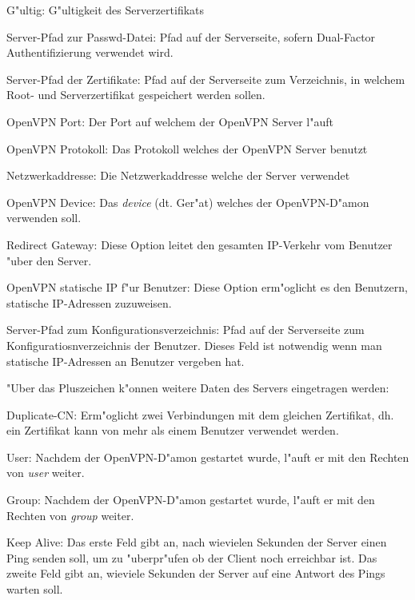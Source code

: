 \begin{items}
	\item G"ultig: G"ultigkeit des Serverzertifikats
	\item Server-Pfad zur Passwd-Datei: Pfad auf der Serverseite, sofern
	      Dual-Factor Authentifizierung verwendet wird.
	\item Server-Pfad der Zertifikate: Pfad auf der Serverseite zum
	Verzeichnis, in welchem Root- und Serverzertifikat gespeichert werden
	sollen.
	\item OpenVPN Port: Der Port auf welchem der OpenVPN Server l"auft
	\item OpenVPN Protokoll: Das Protokoll welches der OpenVPN Server benutzt
	\item Netzwerkaddresse: Die Netzwerkaddresse welche der Server verwendet
	\item OpenVPN Device: Das \textit{device} (dt. Ger"at) welches der
	OpenVPN-D"amon verwenden soll.
	\item Redirect Gateway: Diese Option leitet den gesamten IP-Verkehr vom
	Benutzer "uber den Server.
	\item OpenVPN statische IP f"ur Benutzer: Diese Option erm"oglicht es den
	Benutzern, statische IP-Adressen zuzuweisen.
	\item Server-Pfad zum Konfigurationsverzeichnis: Pfad auf der Serverseite
	zum Konfiguratiosnverzeichnis der Benutzer. Dieses Feld ist notwendig
	wenn man statische IP-Adressen an Benutzer vergeben hat.


\end{items}

\nl "Uber das Pluszeichen k"onnen weitere Daten des Servers eingetragen werden:

\begin{items}
	\item Duplicate-CN: Erm"oglicht zwei Verbindungen mit dem gleichen
	Zertifikat, dh. ein Zertifikat kann von mehr als einem Benutzer verwendet
	werden.
	\item User: Nachdem der OpenVPN-D"amon gestartet wurde, l"auft er mit
	den Rechten von \textit{user} weiter.
	\item Group: Nachdem der OpenVPN-D"amon gestartet wurde, l"auft er mit
	den Rechten von \textit{group} weiter.
	\item Keep Alive: Das erste Feld gibt an, nach wievielen Sekunden der Server
	einen Ping senden soll, um zu "uberpr"ufen ob der Client noch erreichbar
	ist. Das zweite Feld gibt an, wieviele Sekunden der Server auf eine Antwort
	des Pings warten soll.
\end{items}


